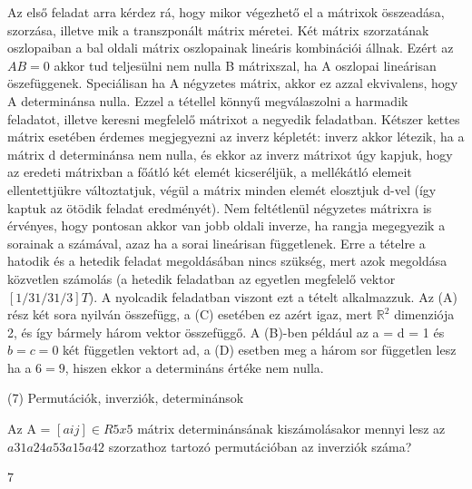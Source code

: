 \begin{frame}
  \begin{tcolorbox}[title={6/8. -Q-}]
Az első feladat arra kérdez rá, hogy mikor végezhető el a mátrixok összeadása, szorzása, illetve mik a transzponált mátrix méretei. Két mátrix szorzatának oszlopaiban a bal oldali mátrix oszlopainak lineáris kombinációi állnak. Ezért az $AB = 0$ akkor tud teljesülni nem nulla B mátrixszal, ha A oszlopai lineárisan öszefüggenek. Speciálisan ha A négyzetes mátrix, akkor ez azzal ekvivalens, hogy A determinánsa nulla. Ezzel a tétellel könnyű megválaszolni a harmadik feladatot, illetve keresni megfelelő mátrixot a negyedik feladatban. Kétszer kettes mátrix esetében érdemes megjegyezni az inverz képletét: inverz akkor létezik, ha a mátrix d determinánsa nem nulla, és ekkor az inverz mátrixot úgy kapjuk, hogy az eredeti mátrixban a főátló két elemét kicseréljük, a mellékátló elemeit ellentettjükre változtatjuk, végül a mátrix minden elemét elosztjuk d-vel (így kaptuk az ötödik feladat eredményét). Nem feltétlenül négyzetes mátrixra is érvényes, hogy pontosan akkor van jobb oldali inverze, ha rangja megegyezik a sorainak a számával, azaz ha a sorai lineárisan függetlenek. Erre a tételre a hatodik és a hetedik feladat megoldásában nincs szükség, mert azok megoldása közvetlen számolás (a hetedik feladatban az egyetlen megfelelő vektor $[1/3 1/3 1/3]T$). A nyolcadik feladatban viszont ezt a tételt alkalmazzuk. Az (A) rész két sora nyilván összefügg, a (C) esetében ez azért igaz, mert $\mathbb{R}^2$ dimenziója 2, és így bármely három vektor összefüggő. A (B)-ben például az a = d = 1 és $b = c = 0$ két független vektort ad, a (D) esetben meg a három sor független lesz ha a $6= 9$, hiszen ekkor a determináns értéke nem nulla.
  \end{tcolorbox}
\end{frame}


\begin{frame}[plain]
\begin{tcolorbox}[center, colback={myyellow}, coltext={black}, colframe={myyellow}]
    {\RHuge  (7) Permutációk, inverziók, determinánsok}
    \mmedskip
\end{tcolorbox}
\end{frame}

\begin{frame}
  \begin{tcolorbox}[title={7/1. -N-}]
    Az A = $[aij] \in R5x5$ mátrix determinánsának kiszámolásakor mennyi lesz az $a31a24a53a15a42$ szorzathoz tartozó permutációban az inverziók száma?

  \tcblower

    \mmedskip 
    
    7
  \end{tcolorbox}
\end{frame}


